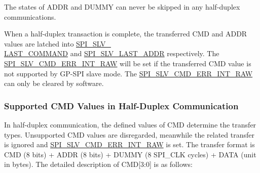 \documentclass[main\_\_EN.tex]{subfiles}
\begin{document}
\begin{tiplisting}
The states of ADDR and DUMMY can never be skipped in any half-duplex communications.
\end{tiplisting}
\vspace{-1em}
When a half-duplex transaction is complete, the transferred CMD and ADDR values are latched into \hyperref[fielddesc:SPISLVLASTCOMMAND]{SPI\_SLV\_\\LAST\_COMMAND} and \hyperref[fielddesc:SPISLVLASTADDR]{SPI\_SLV\_LAST\_ADDR} respectively. The \hyperref[fielddesc:SPISLVCMDERRINTRAW]{SPI\_SLV\_CMD\_ERR\_INT\_RAW} will be set if the transferred CMD value is not supported by GP-SPI slave mode. The \hyperref[fielddesc:SPISLVCMDERRINTRAW]{SPI\_SLV\_CMD\_ERR\_INT\_RAW} can only be cleared by software.



\subsubsection{Supported CMD Values in Half-Duplex Communication} \label{GP-SPI HD salve format}

In half-duplex communication, the defined values of CMD determine the transfer types. Unsupported CMD values are disregarded, meanwhile the related transfer is ignored and \hyperref[fielddesc:SPISLVCMDERRINTRAW]{SPI\_SLV\_CMD\_ERR\_INT\_RAW} is set. The transfer format is CMD (8 bits) + ADDR (8 bits) + DUMMY (8 SPI\_CLK cycles) + DATA (unit in bytes). The detailed description of CMD[3:0] is as follows:
\end{document}
